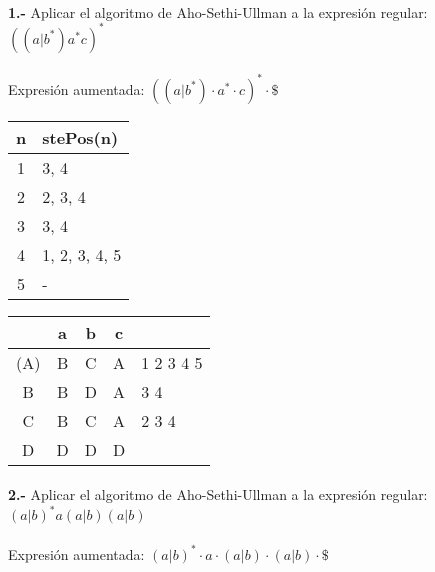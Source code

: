 \documentclass[11pt,a4paper]{report}
\begin{document}
\paragraph{}

\paragraph{}
\textbf{1.-} Aplicar el algoritmo de Aho-Sethi-Ullman a la expresión regular: \textbf{$ ((a|b^*)a^*c)^* $} \\
\\
Expresión aumentada: $ ((a|b^*)\cdot a^*\cdot c)^*\cdot \$  $ \\

\begin{tabular} {| c | l |}
\hline
n & stePos(n) \\ \hline
1 & 3, 4 \\ \hline
2 & 2, 3, 4 \\ \hline
3 & 3, 4 \\ \hline
4 & 1, 2, 3, 4, 5 \\ \hline
5 & - \\ \hline
\end{tabular}
\quad
\begin{tabular} {| c | c |c |c | l |}
\hline 
& a & b & c & \\ \hline
(A) & B & C & A & 1 2 3 4 5 \\ \hline
B & B & D & A & 3 4 \\ \hline
C & B & C & A & 2 3 4 \\ \hline
D & D & D & D & \\ \hline
\end{tabular}\paragraph{}
\textbf{2.-} Aplicar el algoritmo de Aho-Sethi-Ullman a la expresión regular: \textbf{$ (a|b)^*a(a|b)(a|b) $} \\
\\
Expresión aumentada: $ (a|b)^*\cdot a\cdot (a|b)\cdot (a|b)\cdot \$  $ \\
\end{document}
